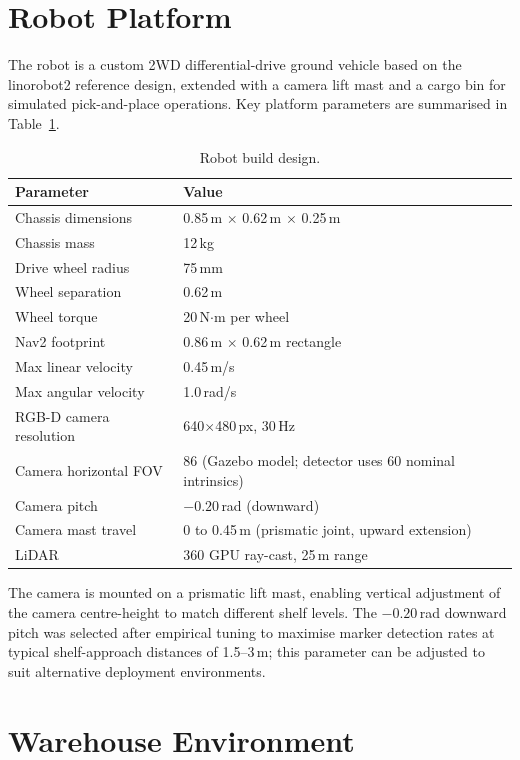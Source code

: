 \documentclass[12pt,a4paper]{report}
\begin{document}
\section{Robot Platform}

The robot is a custom 2WD differential-drive ground vehicle based on the linorobot2 reference design, extended with a camera lift mast and a cargo bin for simulated pick-and-place operations. Key platform parameters are summarised in Table~\ref{tab:robot}.

\begin{table}[H]
\centering
\caption{Robot build design.}
\label{tab:robot}
\begin{tabular}{ll}
\toprule
\textbf{Parameter} & \textbf{Value} \\
\midrule
Chassis dimensions & 0.85\,m $\times$ 0.62\,m $\times$ 0.25\,m \\
Chassis mass & 12\,kg \\
Drive wheel radius & 75\,mm \\
Wheel separation & 0.62\,m \\
Wheel torque & 20\,N$\cdot$m per wheel \\
Nav2 footprint & 0.86\,m $\times$ 0.62\,m rectangle \\
Max linear velocity & 0.45\,m/s \\
Max angular velocity & 1.0\,rad/s \\
RGB-D camera resolution & 640$\times$480\,px, 30\,Hz \\
Camera horizontal FOV & 86\textdegree{} (Gazebo model; detector uses 60\textdegree{} nominal intrinsics) \\
Camera pitch & $-0.20$\,rad (downward) \\
Camera mast travel & 0 to 0.45\,m (prismatic joint, upward extension) \\
LiDAR & 360\textdegree{} GPU ray-cast, 25\,m range \\
\bottomrule
\end{tabular}
\end{table}

The camera is mounted on a prismatic lift mast, enabling vertical adjustment of the camera centre-height to match different shelf levels. The $-0.20$\,rad downward pitch was selected after empirical tuning to maximise marker detection rates at typical shelf-approach distances of 1.5–3\,m; this parameter can be adjusted to suit alternative deployment environments.

\section{Warehouse Environment}
\end{document}
